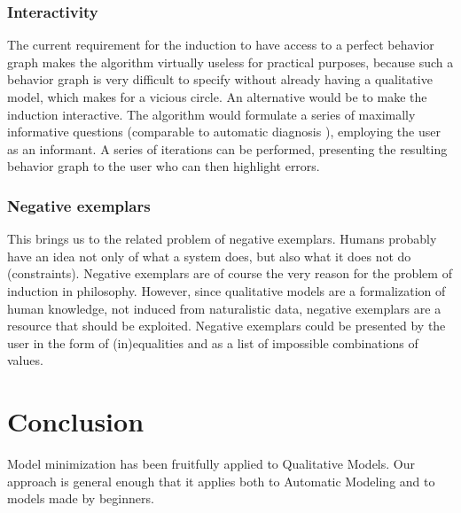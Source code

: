 \documentclass{article} %
\begin{document}
\subsubsection{Interactivity}

The current requirement for the induction to have access to a perfect behavior
graph makes the algorithm virtually useless for practical purposes, because
such a behavior graph is very difficult to specify without already having a
qualitative model, which makes for a vicious circle. An alternative would be
to make the induction interactive. The algorithm would formulate a series of
maximally informative questions (comparable to automatic diagnosis
\cite{dekleerdiag}), employing the user as an informant. A series of
iterations can be performed, presenting the resulting behavior graph to the
user who can then highlight errors.

\subsubsection{Negative exemplars}

This brings us to the related problem of negative exemplars. Humans probably
have an idea not only of what a system does, but also what it does not do
(constraints). Negative exemplars are of course the very reason for the
problem of induction in philosophy. %
However, since qualitative models are a formalization of human knowledge, not
induced from naturalistic data, negative exemplars are a resource that should
be exploited. Negative exemplars could be presented by the user in the form of
(in)equalities and as a list of impossible combinations of values.


\section{Conclusion}

Model minimization has been fruitfully applied to Qualitative Models. Our
approach is general enough that it applies both to Automatic Modeling and to
models made by beginners.
\end{document}
